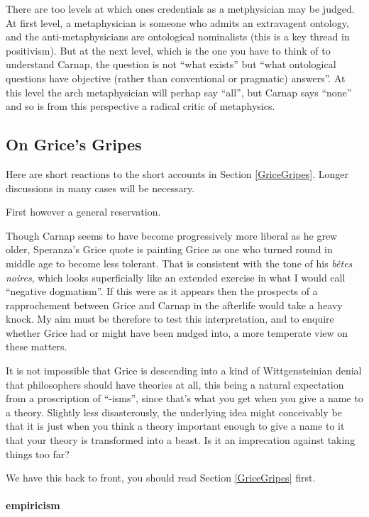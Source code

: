 \documentclass{article}
\begin{document}
There are too levels at which ones credentials as a metphysician may be judged.
At first level, a metaphysician is someone who admits an extravagent ontology, and the anti-metaphysicians are ontological nominalists (this is a key thread in positivism).
But at the next level, which is the one you have to think of to understand Carnap, the question is not ``what exists'' but ``what ontological questions have objective (rather than conventional or pragmatic) answers''.
At this level the arch metaphysician will perhap say ``all'', but Carnap says ``none'' and so is from this perspective a radical critic of metaphysics.

\subsection{On Grice's Gripes}

Here are short reactions to the short accounts in Section \ref{GriceGripes}.
Longer discussions in many cases will be necessary.

First however a general reservation.

Though Carnap seems to have become progressively more liberal as he grew older, Speranza's Grice quote is painting Grice as one who turned round in middle age to become less tolerant.
That is consistent with the tone of his {\it b\^etes noires}, which looks superficially like an extended exercise in what I would call ``negative dogmatism''.
If this were as it appears then the prospects of a rapprochement between Grice and Carnap in the afterlife would take a heavy knock.
My aim must be therefore to test this interpretation, and to enquire whether Grice had or might have been nudged into, a more temperate view on these matters. 

It is not impossible that Grice is descending into a kind of Wittgensteinian denial that philosophers should have theories at all, this being a natural expectation from a proscription of ``-isms'', since that's what you get when you give a name to a theory.
Slightly less disasterously, the underlying idea might conceivably be that it is just when you think a theory important enough to give a name to it that your theory is transformed into a beast.
Is it an imprecation against taking things too far?

We have this back to front, you should read Section \ref{GriceGripes} first.

\paragraph{empiricism}
\end{document}
